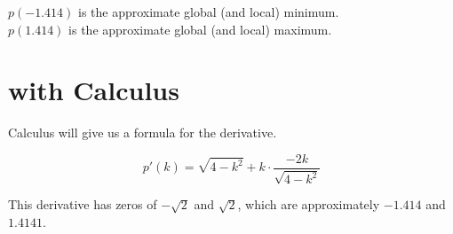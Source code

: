 \documentclass{ximera}
\begin{document}
$p(-1.414)$ is the approximate global (and local) minimum. \\

$p(1.414)$ is the approximate global (and local) maximum. \\




\section{with Calculus}


Calculus will give us a formula for the derivative.

\[    p'(k) = \sqrt{4 - k^2} + k \cdot \frac{-2k}{\sqrt{4-k^2}}  \]


This derivative has zeros of $-\sqrt{2}$ and $\sqrt{2}$, which are approximately $-1.414$ and $1.4141$. 
\end{document}
